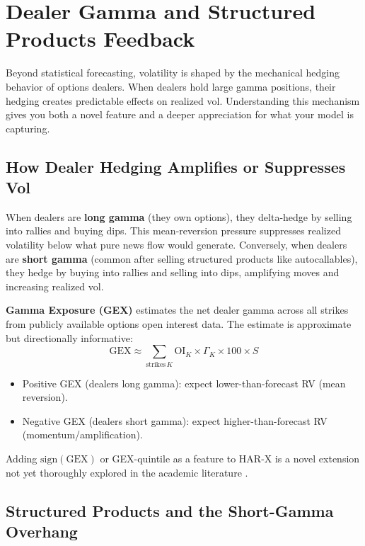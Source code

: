 \section{Dealer Gamma and Structured Products Feedback}
\label{sec:dealer-gamma}

Beyond statistical forecasting, volatility is shaped by the mechanical hedging behavior of options dealers.
When dealers hold large gamma positions, their hedging creates predictable effects on realized vol.
Understanding this mechanism gives you both a novel feature and a deeper appreciation for what your model is capturing.

\subsection{How Dealer Hedging Amplifies or Suppresses Vol}

When dealers are \textbf{long gamma} (they own options), they delta-hedge by selling into rallies and buying dips.
This mean-reversion pressure suppresses realized volatility below what pure news flow would generate.
Conversely, when dealers are \textbf{short gamma} (common after selling structured products like autocallables), they hedge by buying into rallies and selling into dips, amplifying moves and increasing realized vol.

\begin{keyidea}
\textbf{Gamma Exposure (GEX)} estimates the net dealer gamma across all strikes from publicly available options open interest data.
The estimate is approximate but directionally informative:
\begin{equation}\label{eq:gex}
  \text{GEX} \approx \sum_{\text{strikes}\,K} \text{OI}_K \times \Gamma_K \times 100 \times S
\end{equation}
\begin{itemize}[nosep]
  \item Positive GEX (dealers long gamma): expect lower-than-forecast RV (mean reversion).
  \item Negative GEX (dealers short gamma): expect higher-than-forecast RV (momentum/amplification).
\end{itemize}
Adding $\text{sign}(\text{GEX})$ or GEX-quintile as a feature to HAR-X is a novel extension not yet thoroughly explored in the academic literature \citep{Bennett2014}.
\end{keyidea}

\subsection{Structured Products and the Short-Gamma Overhang}

